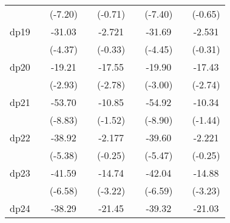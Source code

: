 {\begin{tabular}{l*{8}{c}}
            &                     &     (-7.20)         &                     &     (-0.71)         &                     &     (-7.40)         &                     &     (-0.65)         \\
[1em]
dp19        &                     &      -31.03\sym{***}&                     &      -2.721         &                     &      -31.69\sym{***}&                     &      -2.531         \\
            &                     &     (-4.37)         &                     &     (-0.33)         &                     &     (-4.45)         &                     &     (-0.31)         \\
[1em]
dp20        &                     &      -19.21\sym{**} &                     &      -17.55\sym{**} &                     &      -19.90\sym{**} &                     &      -17.43\sym{**} \\
            &                     &     (-2.93)         &                     &     (-2.78)         &                     &     (-3.00)         &                     &     (-2.74)         \\
[1em]
dp21        &                     &      -53.70\sym{***}&                     &      -10.85         &                     &      -54.92\sym{***}&                     &      -10.34         \\
            &                     &     (-8.83)         &                     &     (-1.52)         &                     &     (-8.90)         &                     &     (-1.44)         \\
[1em]
dp22        &                     &      -38.92\sym{***}&                     &      -2.177         &                     &      -39.60\sym{***}&                     &      -2.221         \\
            &                     &     (-5.38)         &                     &     (-0.25)         &                     &     (-5.47)         &                     &     (-0.25)         \\
[1em]
dp23        &                     &      -41.59\sym{***}&                     &      -14.74\sym{**} &                     &      -42.04\sym{***}&                     &      -14.88\sym{**} \\
            &                     &     (-6.58)         &                     &     (-3.22)         &                     &     (-6.59)         &                     &     (-3.23)         \\
[1em]
dp24        &                     &      -38.29\sym{***}&                     &      -21.45\sym{***}&                     &      -39.32\sym{***}&                     &      -21.03\sym{***}\\

\end{tabular}}
